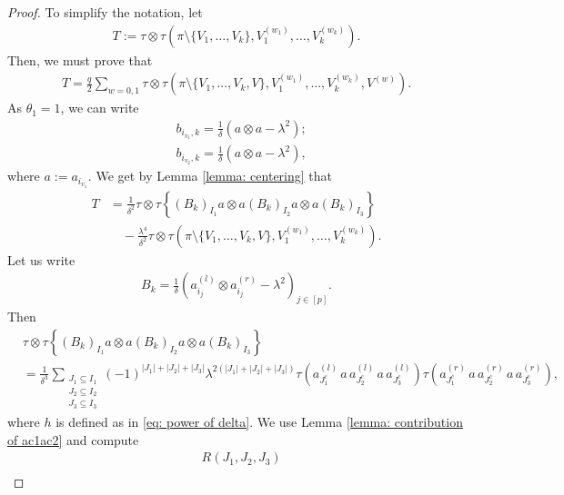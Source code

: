 \documentclass[12pt,reqno]{amsart}
\theoremstyle{plain}
\newcommand{\1}{\mathbf{1}}
\begin{document}
\begin{proof}
    To simplify the notation, let
    \begin{align*}
        T:=\tau\otimes\tau \left(\pi\setminus \{V_1,\ldots,V_{k}\},V_1^{(w_1)},\ldots,V_{k}^{(w_{k})}\right).
    \end{align*}
    Then, we must prove that
    \begin{align*}
        T=\frac{q}{2}\sum_{w=0,1}\tau\otimes\tau \left(\pi\setminus \{V_1,\ldots,V_k,V\},V_1^{(w_1)},\ldots,V_{k}^{(w_{k})},V^{(w)}\right).
    \end{align*}
    As $\theta_1=1$, we can write
    \begin{align*}
        &b_{i_{v_1},k}=\frac{1}{\delta}\left(a\otimes a-\lambda^2\right);\\
        &b_{i_{v_2},k}=\frac{1}{\delta}\left(a\otimes a-\lambda^2\right),
    \end{align*}
    where $a:=a_{i_{v_1}}$. We get by Lemma \ref{lemma: centering} that
    \begin{align}\label{eq: value of T}
        T&=\frac{1}{\delta^2}\tau\otimes \tau\left\{\left(B_k\right)_{I_1}a\otimes a\left(B_k\right)_{I_2}a\otimes a\left(B_k\right)_{I_3}\right\}\nonumber\\
    & \quad -\frac{\lambda^4}{\delta^2}\tau\otimes \tau\left(\pi\setminus\{V_1,\ldots,V_k,V\},V_1^{(w_1)},\ldots,V_k^{(w_k)}\right).
    \end{align}
    Let us write 
    \begin{align*}
        B_k=\frac{1}{\delta}\left(a_{i_j}^{(l)}\otimes a_{i_j}^{(r)}-\lambda^2\right)_{j \in [p]}.
    \end{align*}
    Then
    \begin{align*}
        &\tau\otimes \tau\left\{\left(B_k\right)_{I_1}a\otimes a\left(B_k\right)_{I_2}a\otimes a\left(B_k\right)_{I_3}\right\}\\
        &=\frac{1}{\delta^{h}}\sum_{\substack{J_1 \subseteq I_1\\ J_2 \subseteq I_2\\ J_3 \subseteq I_3}}(-1)^{|J_1|+|J_2|+|J_3|}\lambda^{2(|J_1|+|J_2|+|J_3|)}\tau\left(a_{J_1^c}^{(l)}\, a \, a_{J_2^c}^{(l)}\, a \, a_{J_3^c}^{(l)}\right)\tau\left(a_{J_1^c}^{(r)}\, a \, a_{J_2^c}^{(r)}\, a\, a_{J_3^c}^{(r)}\right),
    \end{align*}
    where $h$ is defined as in \eqref{eq: power of delta}. We use Lemma \ref{lemma: contribution of ac1ac2} and compute
    \begin{align*}
        &R(J_1,J_2,J_3) \\

\end{align*}
\end{proof}
\end{document}
